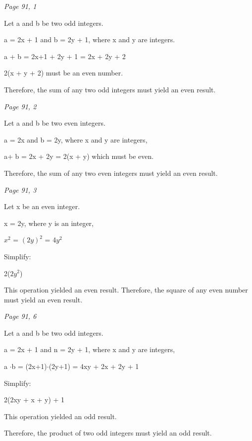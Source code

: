 \documentclass{article}
\begin{document}
\begin{flushleft}
\textit{Page 91, 1}\par
Let a and b be two odd integers.\par
a = 2x + 1 and b = 2y + 1, where x and y are integers.\par

 a + b = 2x+1 + 2y + 1 = 2x + 2y + 2\par

2(x + y + 2) must be an even number.

Therefore, the sum of any two odd integers must yield an even result.\par
\vspace{0.25cm}
\textit{Page 91, 2}\par
Let a and b be two even integers.\par
a = 2x and b = 2y, where x and y are integers,\par

 a+ b = 2x + 2y = 2(x + y) which must be even.

Therefore, the sum of any two even integers must yield an even result.\par
\vspace{0.25cm}
\textit{Page 91, 3}\par
Let x be an even integer.\par
x = 2y, where y is an integer,\par
$x^2$ = $(2y)^2$ = 4$y^2$\par
Simplify:\par
2($2y^2$)
\par
This operation yielded an even result.
Therefore, the square of any even number must yield an even result.\par

\vspace{0.25cm}
\textit{Page 91, 6}\par
Let a and b be two odd integers.\par
a = 2x + 1 and n = 2y + 1, where x and y are integers, \par
a \(\cdot\)b = (2x+1)\(\cdot\)(2y+1) = 4xy + 2x + 2y + 1\par
Simplify:\par
2(2xy + x + y) + 1\par
This operation yielded an odd result.\par
Therefore, the product of two odd integers must yield an odd result.\par


\end{flushleft}
\end{document}
